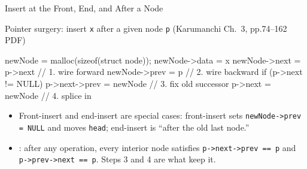 \documentclass[aspectratio=169]{beamer}
\begin{document}
\begin{frame}[fragile]{Insert at the Front, End, and After a Node}
  \begin{block}{Pointer surgery: insert \texttt{x} after a given node
    \texttt{p} (Karumanchi Ch.~3, pp.74--162 PDF)}
\begin{semiverbatim}
newNode = malloc(sizeof(struct node)); newNode->data = x
newNode->next = p->next                 // 1. wire forward
newNode->prev = p                       // 2. wire backward
if (p->next != NULL) p->next->prev = newNode  // 3. fix old successor
p->next = newNode                       // 4. splice in
\end{semiverbatim}
  \end{block}
  \begin{itemize}
    \item Front-insert and end-insert are special cases: front-insert sets
      \texttt{newNode->prev = NULL} and moves \texttt{head}; end-insert is
      ``after the old last node.''
    \item {}: after any operation, every interior
      node satisfies \texttt{p->next->prev == p} and
      \texttt{p->prev->next == p}. Steps 3 and 4 are what keep it.
  \end{itemize}
\end{frame}
\end{document}
